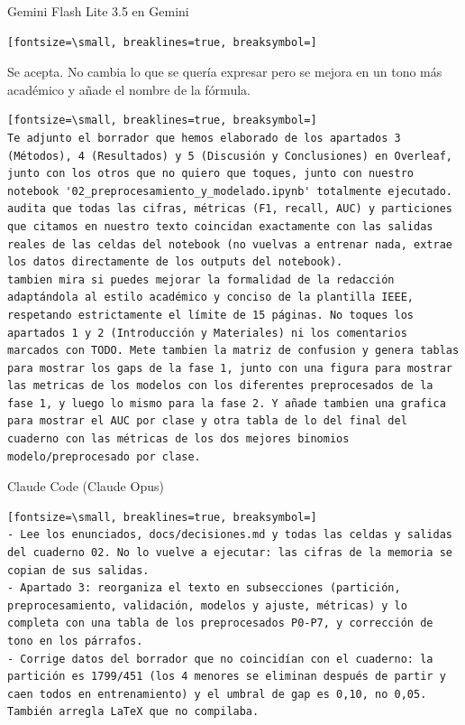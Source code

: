 \documentclass[12pt,a4paper,oneside]{book}
\begin{document}
\begin{iaprompt}
\begin{iaresp}{Gemini Flash Lite 3.5 en Gemini}
\begin{Verbatim}[fontsize=\small, breaklines=true, breaksymbol=]
\end{Verbatim}
\end{iaresp}
\begin{iaanalisis}
Se acepta. No cambia lo que se quería expresar pero se mejora en un tono más académico y añade el nombre de la fórmula.
\end{iaanalisis}



\begin{iaprompt}
\begin{Verbatim}[fontsize=\small, breaklines=true, breaksymbol=]
Te adjunto el borrador que hemos elaborado de los apartados 3 (Métodos), 4 (Resultados) y 5 (Discusión y Conclusiones) en Overleaf, junto con los otros que no quiero que toques, junto con nuestro notebook '02_preprocesamiento_y_modelado.ipynb' totalmente ejecutado. audita que todas las cifras, métricas (F1, recall, AUC) y particiones que citamos en nuestro texto coincidan exactamente con las salidas reales de las celdas del notebook (no vuelvas a entrenar nada, extrae los datos directamente de los outputs del notebook).
tambien mira si puedes mejorar la formalidad de la redacción adaptándola al estilo académico y conciso de la plantilla IEEE, respetando estrictamente el límite de 15 páginas. No toques los apartados 1 y 2 (Introducción y Materiales) ni los comentarios marcados con TODO. Mete tambien la matriz de confusion y genera tablas para mostrar los gaps de la fase 1, junto con una figura para mostrar las metricas de los modelos con los diferentes preprocesados de la fase 1, y luego lo mismo para la fase 2. Y añade tambien una grafica para mostrar el AUC por clase y otra tabla de lo del final del cuaderno con las métricas de los dos mejores binomios modelo/preprocesado por clase.
\end{Verbatim}
\end{iaprompt}
\begin{iaresp}{Claude Code (Claude Opus)}
\begin{Verbatim}[fontsize=\small, breaklines=true, breaksymbol=]
- Lee los enunciados, docs/decisiones.md y todas las celdas y salidas del cuaderno 02. No lo vuelve a ejecutar: las cifras de la memoria se copian de sus salidas.
- Apartado 3: reorganiza el texto en subsecciones (partición, preprocesamiento, validación, modelos y ajuste, métricas) y lo completa con una tabla de los preprocesados P0-P7, y corrección de tono en los párrafos.
- Corrige datos del borrador que no coincidían con el cuaderno: la partición es 1799/451 (los 4 menores se eliminan después de partir y caen todos en entrenamiento) y el umbral de gap es 0,10, no 0,05. También arregla LaTeX que no compilaba.

\end{Verbatim}
\end{iaresp}
\end{iaprompt}
\end{document}
